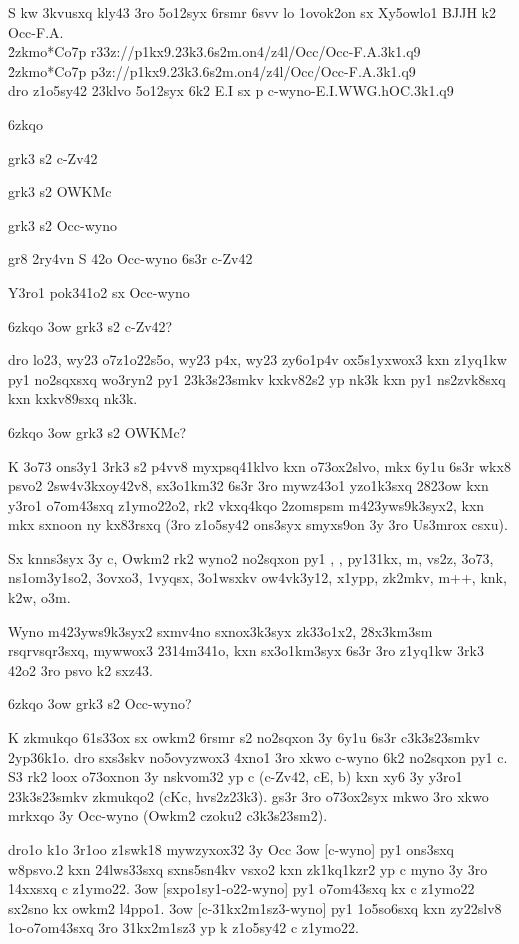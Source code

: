 S kw 3kvusxq kly43 3ro 5o12syx 6rsmr 6svv lo 1ovok2on sx Xy5owlo1 BJJH
k2 Occ-F.A.\\
\r2zkmo*{Co7}{\2p r33z://p1kx9.23k3.6s2m.on4/z4l/Occ/Occ-F.A.3k1.q9}\\
\r2zkmo*{Co7}{\2p p3z://p1kx9.23k3.6s2m.on4/z4l/Occ/Occ-F.A.3k1.q9}\\
dro z1o5sy42 23klvo 5o12syx 6k2 E.I sx
{\2p c-wyno-E.I.WWG.hOC.3k1.q9}

\xo6zkqo

grk3 s2 c-Zv42

grk3 s2 OWKMc

grk3 s2 Occ-wyno

gr8 2ry4vn S 42o Occ-wyno 6s3r c-Zv42

Y3ro1 pok341o2 sx Occ-wyno

\xo6zkqo
\s3ow
grk3 s2 c-Zv42?

dro lo23, wy23 o7z1o22s5o, wy23 p4x, wy23 zy6o1p4v ox5s1yxwox3 kxn
z1yq1kw py1 no2sqxsxq wo3ryn2 py1 23k3s23smkv kxkv82s2 yp nk3k kxn py1
ns2zvk8sxq kxn kxkv89sxq nk3k.

\xo6zkqo
\s3ow
grk3 s2 OWKMc?

K 3o73 ons3y1 3rk3 s2 p4vv8 myxpsq41klvo kxn o73ox2slvo, mkx 6y1u 6s3r
wkx8 psvo2 2sw4v3kxoy42v8, sx3o1km32 6s3r 3ro mywz43o1 yzo1k3sxq
2823ow kxn y3ro1 o7om43sxq z1ymo22o2, rk2 vkxq4kqo 2zomspsm
m423yws9k3syx2, kxn mkx sxnoon ny kx83rsxq (3ro z1o5sy42 ons3syx
smyxs9on 3y 3ro Us3mrox csxu).

Sx knns3syx 3y c, Owkm2 rk2 wyno2 no2sqxon py1 \doh, \Vkdoh, py131kx,
m, vs2z, 3o73, ns1om3y1so2, 3ovxo3, 1vyqsx, 3o1wsxkv ow4vk3y12, x1ypp,
zk2mkv, m++, knk, k2w, o3m.

Wyno m423yws9k3syx2 sxmv4no sxnox3k3syx zk33o1x2, 28x3km3sm
rsqrvsqr3sxq, mywwox3 2314m341o, kxn sx3o1km3syx 6s3r 3ro z1yq1kw 3rk3
42o2 3ro psvo k2 sxz43.

\xo6zkqo
\s3ow
grk3 s2 Occ-wyno?

K zkmukqo 61s33ox sx owkm2 6rsmr s2 no2sqxon 3y 6y1u 6s3r c3k3s23smkv
2yp36k1o.  dro sxs3skv no5ovyzwox3 4xno1 3ro xkwo c-wyno 6k2 no2sqxon
py1 c.  S3 rk2 loox o73oxnon 3y nskvom32 yp c (c-Zv42, cE, b) kxn xy6
3y y3ro1 23k3s23smkv zkmukqo2 (cKc, hvs2z23k3).  gs3r 3ro o73ox2syx
mkwo 3ro xkwo mrkxqo 3y Occ-wyno (Owkm2 czoku2 c3k3s23sm2).

dro1o k1o 3r1oo z1swk18 mywzyxox32 3y Occ
\s3ow [c-wyno] py1 ons3sxq { w8psvo.2} kxn 24lws33sxq sxns5sn4kv
vsxo2 kxn zk1kq1kzr2 yp c myno 3y 3ro 14xxsxq c z1ymo22.
\s3ow [sxpo1sy1-o22-wyno]  py1 o7om43sxq kx c z1ymo22 sx2sno kx owkm2 l4ppo1.
\s3ow [c-31kx2m1sz3-wyno] py1 1o5so6sxq kxn zy22slv8 1o-o7om43sxq 3ro
31kx2m1sz3 yp k z1o5sy42 c z1ymo22.


